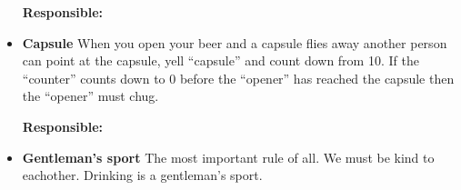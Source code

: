 \documentclass[../../../main.tex]{subfiles}
\begin{document}
\begin{itemize}
    \textbf{Responsible:} \placeholder


    \item \textbf{Capsule}
    When you open your beer and a capsule flies away another person can point at the capsule, yell ``capsule'' and count down from 10. If the ``counter'' counts down to 0 before the ``opener'' has reached the capsule then the ``opener'' must chug.
    
    \textbf{Responsible:} \placeholder
    
    \item \textbf{Gentleman's sport}
    The most important rule of all. We must be kind to eachother. Drinking is a gentleman's sport.
\end{itemize}
\end{document}
